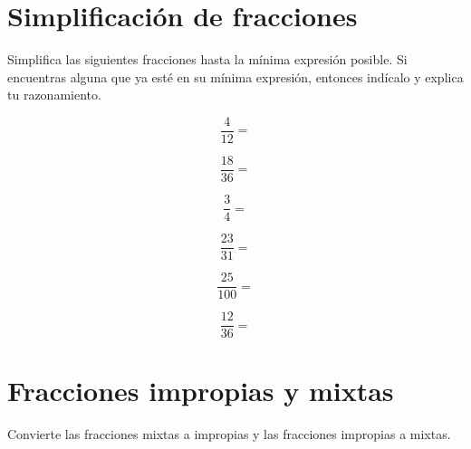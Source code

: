 \documentclass[11pt]{article}
\begin{document}
\vspace{1cm}  

\section{Simplificaci\'on de fracciones}
Simplifica las siguientes fracciones hasta la m\'inima expresi\'on posible. Si
encuentras alguna que ya est\'e en su m\'inima expresi\'on, entonces ind\'icalo
y explica tu razonamiento.

\begin{multicols}{2}

\begin{equation}    \frac{4}{12}=   \nonumber\end{equation}

\begin{equation}    \frac{18}{36}=  \nonumber\end{equation}

\begin{equation}    \frac{3}{4}=    \nonumber\end{equation}

\begin{equation}    \frac{23}{31}=  \nonumber\end{equation}

\begin{equation}    \frac{25}{100}= \nonumber\end{equation}

\begin{equation}    \frac{12}{36}=  \nonumber\end{equation}

\end{multicols}

\vspace{1cm}

\section{Fracciones impropias y mixtas}
Convierte las fracciones mixtas a impropias y las fracciones impropias a mixtas.
\end{document}
